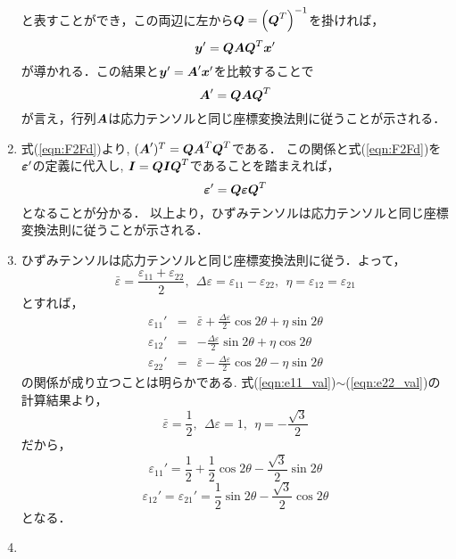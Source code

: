 \documentclass[10pt,a4j]{jarticle}
\begin{document}
\begin{enumerate}
	と表すことができ，この両辺に左から$\mbox{\boldmath $Q$}=\left(\mbox{\boldmath $Q$}^T\right)^{-1}$を掛ければ，
	\begin{equation}
		\mbox{\boldmath $y$}'
		=
		\mbox{\boldmath $Q$}\mbox{\boldmath $A$}\mbox{\boldmath $Q$}^T \mbox{\boldmath $x$}'
	\end{equation}
	が導かれる．この結果と$\mbox{\boldmath $y$}' = \mbox{\boldmath $A$}'\mbox{\boldmath $x$}'$を比較することで
	\begin{equation}
		\mbox{\boldmath $A$}'=\mbox{\boldmath $Q$} \mbox{\boldmath $A$}\mbox{\boldmath $Q$}^T
		\label{eqn:F2Fd}
	\end{equation}
	が言え，行列$\mbox{\boldmath $A$}$は応力テンソルと同じ座標変換法則に従うことが示される．
\item
	式(\ref{eqn:F2Fd})より, $(\mbox{\boldmath $A$}')^T=\mbox{\boldmath $Q$}\mbox{\boldmath $A$}^T\mbox{\boldmath $Q$}^T$である．
	この関係と式(\ref{eqn:F2Fd})を$\mbox{\boldmath $\varepsilon$}'$の定義に代入し, 
	$\mbox{\boldmath $I$}=\mbox{\boldmath $Q$}\mbox{\boldmath $I$}\mbox{\boldmath $Q$}^T$であることを踏まえれば，
	\begin{equation}
		\mbox{\boldmath $\varepsilon$}'=\mbox{\boldmath $Q$}\mbox{\boldmath $\varepsilon$}\mbox{\boldmath $Q$}^T
	\end{equation}
	となることが分かる．
	以上より，ひずみテンソルは応力テンソルと同じ座標変換法則に従うことが示される．
\item
	ひずみテンソルは応力テンソルと同じ座標変換法則に従う．よって，
	\begin{equation}
		\bar \varepsilon = \frac{\varepsilon_{11}+ \varepsilon_{22}}{2} , \ \ 
		\Delta  \varepsilon = \varepsilon_{11}- \varepsilon_{22}, \ \ 
		\eta = \varepsilon_{12}=\varepsilon_{21}
	\end{equation}
	とすれば，
	\begin{eqnarray}
		\varepsilon_{11}' &=& 
			\bar \varepsilon + \frac{\Delta \varepsilon}{2} \cos 2\theta + \eta \sin 2\theta 
			\label{eqn:e11d}
			\\
		\varepsilon_{12}' &=& 
			-\frac{\Delta \varepsilon}{2} \sin 2\theta + \eta \cos 2\theta 
			\label{eqn:e12d}
			\\
		\varepsilon_{22}' &=& 
			\bar \varepsilon - \frac{\Delta \varepsilon}{2} \cos 2\theta - \eta \sin 2\theta 
			\label{eqn:e22d}
	\end{eqnarray}
	の関係が成り立つことは明らかである.
	式(\ref{eqn:e11_val})$\sim$(\ref{eqn:e22_val})の計算結果より，
	\[
		\bar\varepsilon = \frac{1}{2}, \ \ \Delta \varepsilon =1, \ \ \eta = -\frac{\sqrt{3}}{2}
	\]
	だから，
	\[
		\varepsilon_{11}'=
		\frac{1}{2} + \frac{1}{2} \cos 2\theta -\frac{\sqrt{3}}{2} \sin 2\theta 
	\]
	\[
		\varepsilon_{12}'=\varepsilon_{21}'
		=
		 \frac{1}{2} \sin 2\theta -\frac{\sqrt{3}}{2} \cos 2\theta 
	\]
	となる．
\item
	\begin{equation}

\end{equation}
\end{enumerate}
\end{document}

